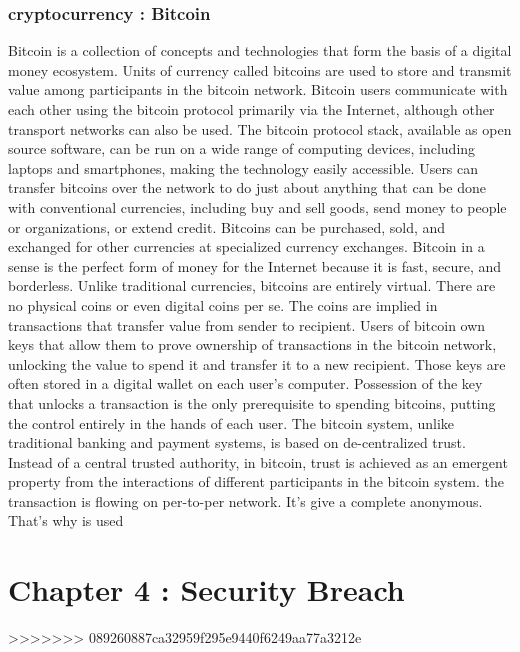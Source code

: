 \documentclass[twosided,a4,10pt]{article}
\begin{document}
\begin{multicols}{2}
\subsubsection{cryptocurrency : Bitcoin}

Bitcoin is a collection of concepts and technologies that form the basis of a digital money ecosystem. Units of currency called bitcoins are used to store and transmit value among participants in the bitcoin network. Bitcoin users communicate with each other using the bitcoin protocol primarily via the Internet, although other transport networks can also be used. The bitcoin protocol stack, available as open source software, can be run on a wide range of computing devices, including laptops and smartphones, making the technology easily accessible. \newline
Users can transfer bitcoins over the network to do just about anything that can be done with conventional currencies, including buy and sell goods, send money to people or organizations, or extend credit. Bitcoins can be purchased, sold, and exchanged for other currencies at specialized currency exchanges. Bitcoin in a sense is the perfect form of money for the Internet because it is fast, secure, and borderless.\newline
\newline
Unlike traditional currencies, bitcoins are entirely virtual. There are no physical coins or even digital coins per se. The coins are implied in transactions that transfer value from sender to recipient. Users of bitcoin own keys that allow them to prove ownership of transactions in the bitcoin network, unlocking the value to spend it and transfer it to a new recipient. Those keys are often stored in a digital wallet on each user’s computer. Possession of the key that unlocks a transaction is the only prerequisite to spending bitcoins, putting the control entirely in the hands of each user.\newline
The bitcoin system, unlike traditional banking and payment systems, is based on de-centralized trust. Instead of a central trusted authority, in bitcoin, trust is achieved as an emergent property from the interactions of different participants in the bitcoin system. the transaction is flowing on per-to-per network. It's give a 
complete anonymous. That's why is used
 
\section{Chapter 4 : Security Breach}
>>>>>>> 089260887ca32959f295e9440f6249aa77a3212e


\end{multicols}
\end{document}
